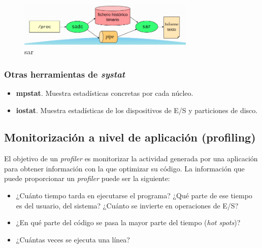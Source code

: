 \documentclass[12pt,spanish]{article}
\begin{document}
\begin{figure}[H]
	\centering
	\includegraphics[width=0.75\textwidth]{sar.png}
	\caption{sar}
\end{figure}

\subsubsection{Otras herramientas de \textit{systat}}
\begin{itemize}
	\item \textbf{mpstat}. Muestra estadísticas concretas por cada núcleo.
	\item \textbf{iostat}. Muestra estadísticas de los dispositivos de E/S y particiones de disco.
\end{itemize}


\subsection{Monitorización a nivel de aplicación (profiling)}

El objetivo de un \textit{profiler} es monitorizar la actividad generada por una aplicación para obtener información con la que optimizar su código. La información que puede proporcionar un \textit{profiler} puede ser la siguiente:
\begin{itemize}
	\item ¿Cuánto tiempo tarda en ejecutarse el programa? ¿Qué parte de ese tiempo es del usuario, del sistema? ¿Cuánto se invierte en operaciones de E/S?
	\item ¿En qué parte del código se pasa la mayor parte del tiempo (\textit{hot spots})?
	\item ¿Cuántas veces se ejecuta una línea?
\end{itemize}
\end{document}

